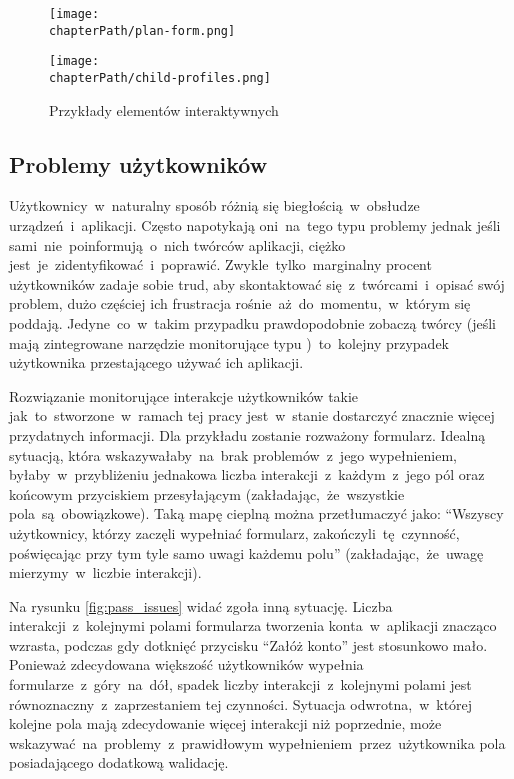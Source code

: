 \bigskip
\begin{figure}[H]
\centering
\begin{minipage}{.35\textwidth}
	\centering
	\texttt{[image: \\chapterPath/plan-form.png]}
\end{minipage}
\begin{minipage}{.45\textwidth}
	\centering
	\texttt{[image: \\chapterPath/child-profiles.png]}
\end{minipage}
\bigskip
\caption{Przykłady elementów interaktywnych}
\label{fig:interactive_areas}
\end{figure}

\subsection{Problemy użytkowników}
Użytkownicy~w~naturalny sposób różnią się biegłością~w~obsłudze urządzeń~i~aplikacji. Często napotykają oni~na~tego typu problemy jednak jeśli sami~nie~poinformują~o~nich twórców aplikacji, ciężko jest~je~zidentyfikować~i~poprawić. Zwykle~tylko~marginalny procent użytkowników zadaje sobie trud, aby skontaktować się~z~twórcami~i~opisać swój problem, dużo częściej ich frustracja rośnie~aż~do~momentu,~w~którym się poddają. Jedyne~co~w~takim przypadku prawdopodobnie zobaczą twórcy (jeśli mają zintegrowane narzędzie monitorujące typu )~to~kolejny przypadek użytkownika przestającego używać ich aplikacji. 

Rozwiązanie monitorujące interakcje użytkowników takie jak~to~stworzone~w~ramach tej pracy jest~w~stanie dostarczyć znacznie więcej przydatnych informacji. Dla przykładu zostanie rozważony formularz. Idealną sytuacją, która wskazywałaby~na~brak problemów~z~jego wypełnieniem, byłaby~w~przybliżeniu jednakowa liczba interakcji~z~każdym~z~jego pól oraz końcowym przyciskiem przesyłającym (zakładając,~że~wszystkie pola~są~obowiązkowe). Taką mapę cieplną można przetłumaczyć jako: ``Wszyscy użytkownicy, którzy zaczęli wypełniać formularz, zakończyli~tę~czynność, poświęcając przy tym tyle samo uwagi każdemu polu'' (zakładając,~że~uwagę mierzymy~w~liczbie interakcji). 

Na rysunku \ref{fig:pass_issues} widać zgoła inną sytuację. Liczba interakcji~z~kolejnymi polami formularza tworzenia konta~w~aplikacji znacząco wzrasta, podczas gdy dotknięć przycisku ``Załóż konto'' jest stosunkowo mało. Ponieważ zdecydowana większość użytkowników wypełnia formularze~z~góry~na~dół, spadek liczby interakcji~z~kolejnymi polami jest równoznaczny~z~zaprzestaniem tej czynności. Sytuacja odwrotna,~w~której kolejne pola mają zdecydowanie więcej interakcji niż poprzednie, może wskazywać~na~problemy~z~prawidłowym wypełnieniem~przez~użytkownika pola posiadającego dodatkową walidację. 

